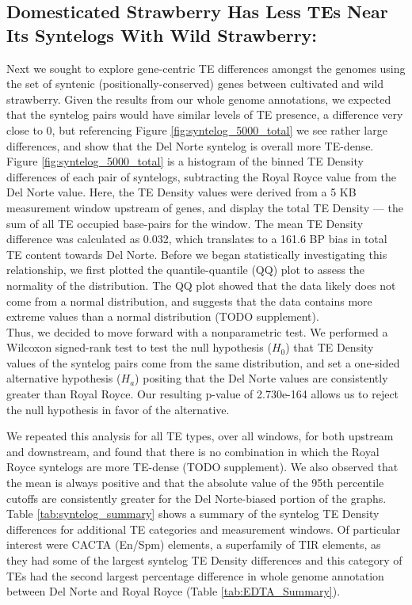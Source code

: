 \documentclass[fleqn,10pt]{olplainarticle}
\begin{document}
\subsection*{Domesticated Strawberry Has Less TEs Near Its Syntelogs With Wild Strawberry:}
Next we sought to explore gene-centric TE differences amongst the genomes using the set of syntenic (positionally-conserved) genes between cultivated and wild strawberry.
Given the results from our whole genome annotations, we expected that the syntelog pairs would have similar levels of TE presence, a difference very close to 0, but referencing Figure \ref{fig:syntelog_5000_total} we see rather large differences, and show that the Del Norte syntelog is overall more TE-dense.
Figure \ref{fig:syntelog_5000_total} is a histogram of the binned TE Density differences of each pair of syntelogs, subtracting the Royal Royce value from the Del Norte value.
Here, the TE Density values were derived from a 5 KB measurement window upstream of genes, and display the total TE Density --- the sum of all TE occupied base-pairs for the window.
The mean TE Density difference was calculated as 0.032, which translates to a 161.6 BP bias in total TE content towards Del Norte.
Before we began statistically investigating this relationship, we first plotted the quantile-quantile (QQ) plot to assess the normality of the distribution.
The QQ plot showed that the data likely does not come from a normal distribution, and suggests that the data contains more extreme values than a normal distribution (TODO supplement).\\

Thus, we decided to move forward with a nonparametric test.
We performed a Wilcoxon signed-rank test to test the null hypothesis ($H_{0}$) that TE Density values of the syntelog pairs come from the same distribution, and set a one-sided alternative hypothesis ($H_{a}$) positing that the Del Norte values are consistently greater than Royal Royce.
Our resulting p-value of 2.730e-164 allows us to reject the null hypothesis in favor of the alternative.

We repeated this analysis for all TE types, over all windows, for both upstream and downstream, and found that there is no combination in which the Royal Royce syntelogs are more TE-dense (TODO supplement).
We also observed that the mean is always positive and that the absolute value of the 95th percentile cutoffs are consistently greater for the Del Norte-biased portion of the graphs.
Table \ref{tab:syntelog_summary} shows a summary of the syntelog TE Density differences for additional TE categories and measurement windows.
Of particular interest were CACTA (En/Spm) elements, a superfamily of TIR elements, as they had some of the largest syntelog TE Density differences and this category of TEs had the second largest percentage difference in whole genome annotation between Del Norte and Royal Royce (Table \ref{tab:EDTA_Summary}).
\end{document}
